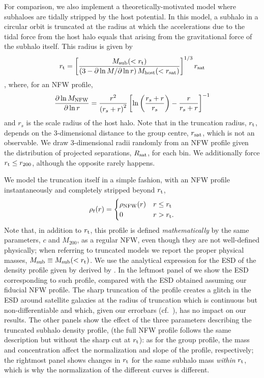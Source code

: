 For comparison, we also implement a theoretically-motivated model where subhaloes are tidally 
stripped by the host potential. In this model, a subhalo in a circular orbit is truncated at the 
radius at which the accelerations due to the tidal force from the host halo equals that arising 
from the gravitational force of the subhalo itself. This radius is given by
\begin{equation}\label{eq:rt}
 r_{\rm t} = \left[\frac{M_{\rm sub}(<r_{\rm t})}{\left(3-\partial\ln M/\partial\ln r\right)M_{\rm 
host}(<r_{\rm sat})}\right]^{1/3}r_{\rm sat}
\end{equation}
\citep{king62,binney87,mo10}, where, for an NFW profile,
\begin{equation}\label{eq:dlnMdlnr}
 \frac{\partial\ln M_{\rm NFW}}{\partial\ln r} = 
\frac{r^2}{\left(r_s+r\right)^2}\left[\ln\left(\frac{r_s+r}{r_s}\right) - 
\frac{r}{r_s+r}\right]^{-1}
\end{equation}
and $r_s$ is the scale radius of the host halo. Note that in  the truncation radius, 
$r_{\rm t}$, depends on the 3-dimensional distance to the group centre, $r_{\rm sat}$, which is not 
an observable. We draw 3-dimensional radii randomly from an NFW profile given the distribution of 
projected separations, $R_{\rm sat}$, for each bin. We additionally force $r_{\rm t} \leq r_{200}$, 
although the opposite rarely happens.

We model the truncation itself in a simple fashion, with an NFW profile instantaneously and 
completely stripped beyond $r_{\rm t}$,
\begin{equation}\label{eq:tNFW}
 \rho_t(r) = 
\begin{cases}
 \rho_{\rm NFW}(r) & r \leq r_{\rm t} \\
 0 & r > r_{\rm t}.
\end{cases}
\end{equation}
Note that, in addition to $r_{\rm t}$, this profile is defined \textit{mathematically} by the same 
parameters, $c$ and $M_{200}$, as a regular NFW, even though they are not well-defined 
physically; when referring to truncated models we report the proper physical masses, $M_{\rm 
sub} \equiv M_{\rm sub}(<r_{\rm t})$. We use the analytical expression for the ESD of the density 
profile given by  derived by \cite{baltz09}. In the leftmost panel of
 we show the ESD corresponding to such profile, compared with the 
ESD obtained assuming our fiducial NFW profile. The sharp truncation of the profile creates a glitch 
in the ESD around satellite galaxies at the radius of truncation which is continuous but 
non-differentiable and which, given our errorbars (cf.\ ), has no impact on our 
results. The other panels show the effect of the three parameters describing the truncated subhalo 
density profile,  (the full NFW profile follows the same description but without the 
sharp cut at $r_{\rm t}$): as for the group profile, the mass and concentration affect the 
normalization and slope of the profile, respectively; the rightmost panel shows changes in $r_{\rm 
t}$ for the same subhalo mass \textit{within} $r_{\rm t}$, which is why the normalization of the 
different curves is different.


